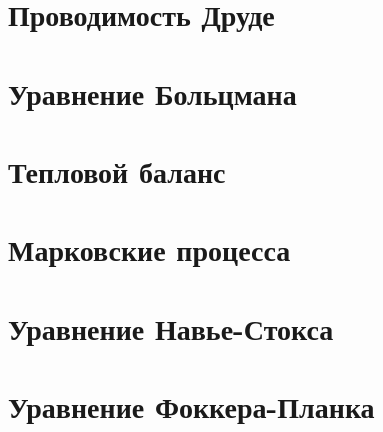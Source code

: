 





\section{Проводимость Друде}


\section{Уравнение Больцмана}


\section{Тепловой баланс}


\section{Марковские процесса}


\section{Уравнение Навье-Стокса}


\section{Уравнение Фоккера-Планка}



% 

% 



% 







% 